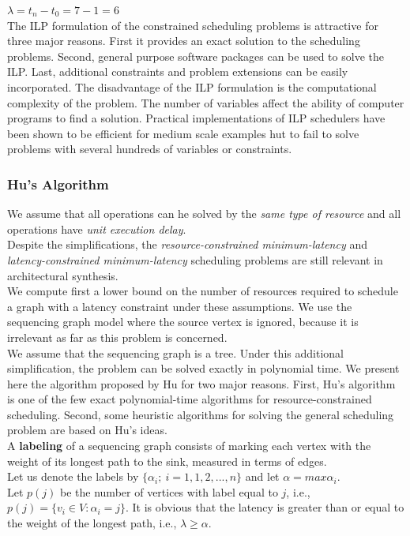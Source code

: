 $\lambda = t_{n} - t_{0}= 7-1 = 6$
\bigskip \\
The ILP formulation of the constrained scheduling problems is attractive for three major reasons. First it provides an exact solution to the scheduling problems. Second, general purpose software packages can be used to solve the ILP. Last, additional constraints and problem extensions can be easily incorporated. The disadvantage of the ILP formulation is the computational complexity of the problem. The number of variables affect the ability of computer programs to find a solution. Practical implementations of ILP schedulers have been shown to be efficient for medium scale examples hut to fail to solve problems with several hundreds of variables or constraints.

\subsubsection{Hu's Algorithm}
We assume that all operations can he solved by the \textit{same type of resource} and all operations have \textit{unit execution delay}.\\
Despite the simplifications, the \textit{resource-constrained minimum-latency} and \textit{latency-constrained minimum-latency} scheduling problems are  still relevant in architectural synthesis.\\
We compute first a lower bound on the number of resources required to schedule a graph with a latency constraint under these assumptions. We use the sequencing graph model where the source vertex is ignored, because it is irrelevant as far as this problem is concerned.\\
We assume that the sequencing graph is a tree. Under this additional simplification, the problem can  be  solved exactly in polynomial time. We present here the algorithm proposed by Hu for two major reasons. First, Hu's algorithm is one of the few exact polynomial-time algorithms for resource-constrained scheduling. Second, some heuristic algorithms for solving the general scheduling problem are based on Hu's ideas.\\
A  \textbf{labeling}  of a sequencing graph consists of marking each vertex with the weight of its longest path to the sink, measured  in  terms of edges.\\
Let us denote the labels by $ \lbrace\alpha_i;\: i=1, 1, 2,..., n \rbrace $ and let $ \alpha = max \alpha_i $.\\
Let $ p(j) $ be the number of vertices with label equal to $ j $, i.e., $ p(j)=\lbrace v_i \in V : \alpha_i=j \rbrace $. It is obvious that the latency is greater than or equal to the weight of the longest path,
i.e.,  $ \lambda \geq \alpha $.

